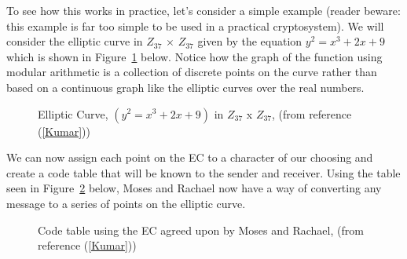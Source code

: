 To see how this works in practice, let's consider a simple example (reader beware: this example is far too simple to be used in a practical cryptosystem). We will consider the elliptic curve in $Z_{37}$ $\times$ $Z_{37}$ given by the equation $y^2 = x^3 + 2x + 9$ which is shown in Figure~\ref{fig:DH:DHKE_11} below. Notice how the graph of the function using modular arithmetic is a collection of discrete points on the curve rather than based on a continuous graph like the elliptic curves over the real numbers.

\begin{figure}[H]
	  \caption{\label{fig:DH:DHKE_11} Elliptic Curve, $(y^2 = x^3 + 2x + 9)$ in $Z_{37}$ x $Z_{37}$, (from reference (\ref{Kumar}))}
\end{figure}

We can now assign each point on the EC to a character of our choosing and create a code table that will be known to the sender and receiver. Using the table seen in Figure~\ref{fig:DH:DHKE_17} below, Moses and Rachael now have a way of converting any message to a series of points on the elliptic curve.

\begin{figure}[H]
	  \caption{\label{fig:DH:DHKE_17} Code table using the EC agreed upon by Moses and Rachael, (from reference (\ref{Kumar}))}
\end{figure}


